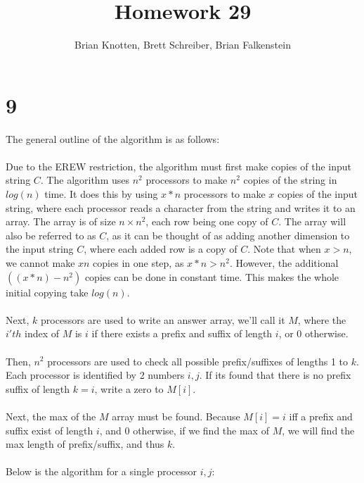 \documentclass[letterpaper,notitlepage,twoside]{article}
\begin{document}
\title{Homework 29}
\author{Brian Knotten, Brett Schreiber, Brian Falkenstein}
\maketitle

\section*{9}
The general outline of the algorithm is as follows:\\\\
Due to the EREW restriction, the algorithm must first make copies of the input string $C$. The algorithm uses $n^2$ processors to make $n^2$ copies of the string in $log(n)$ time. It does this by using $x*n$ processors to make $x$ copies of the input string, where each processor reads a character from the string and writes it to an array. The array is of size $n\times n^2$, each row being one copy of $C$. The array will also be referred to as $C$, as it can be thought of as adding another dimension to the input string $C$, where each added row is a copy of $C$. Note that when $x>n$, we cannot make $xn$ copies in one step, as $x*n > n^2$. However, the additional $((x*n) - n^2)$ copies can be done in constant time. This makes the whole initial copying take $log(n)$. \\\\
Next, $k$ processors are used to write an answer array, we'll call it $M$, where the $i'th$ index of $M$ is $i$ if there exists a prefix and suffix of length $i$, or $0$ otherwise. \\\\
Then, $n^2$ processors are used to check all possible prefix/suffixes of lengths 1 to $k$. Each processor is identified by 2 numbers $i, j$. If its found that there is no prefix suffix of length $k=i$, write a zero to $M[i]$. \\\\
Next, the max of the $M$ array must be found. Because $M[i] = i$ iff a prefix and suffix exist of length $i$, and $0$ otherwise, if we find the max of $M$, we will find the max length of prefix/suffix, and thus $k$. \\\\
Below is the algorithm for a single processor $i, j$:
\end{document}
